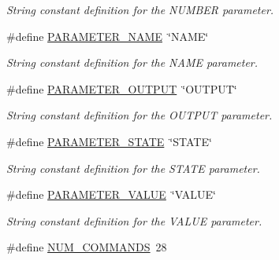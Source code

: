 \begin{DoxyCompactItemize}
\begin{DoxyCompactList}\small\item\em String constant definition for the N\-U\-M\-B\-E\-R parameter. \end{DoxyCompactList}\item 
\hypertarget{group__command__interpreter_gacd4917419f347a3210e7b468c47188f0}{\#define \hyperlink{group__command__interpreter_gacd4917419f347a3210e7b468c47188f0}{P\-A\-R\-A\-M\-E\-T\-E\-R\-\_\-\-N\-A\-M\-E}~\char`\"{}N\-A\-M\-E\char`\"{}}\label{group__command__interpreter_gacd4917419f347a3210e7b468c47188f0}

\begin{DoxyCompactList}\small\item\em String constant definition for the N\-A\-M\-E parameter. \end{DoxyCompactList}\item 
\hypertarget{group__command__interpreter_gae845277b8fe01a11cfad1732696507d3}{\#define \hyperlink{group__command__interpreter_gae845277b8fe01a11cfad1732696507d3}{P\-A\-R\-A\-M\-E\-T\-E\-R\-\_\-\-O\-U\-T\-P\-U\-T}~\char`\"{}O\-U\-T\-P\-U\-T\char`\"{}}\label{group__command__interpreter_gae845277b8fe01a11cfad1732696507d3}

\begin{DoxyCompactList}\small\item\em String constant definition for the O\-U\-T\-P\-U\-T parameter. \end{DoxyCompactList}\item 
\hypertarget{group__command__interpreter_gaa4e33f1b6e384ab8abcb41c12924896c}{\#define \hyperlink{group__command__interpreter_gaa4e33f1b6e384ab8abcb41c12924896c}{P\-A\-R\-A\-M\-E\-T\-E\-R\-\_\-\-S\-T\-A\-T\-E}~\char`\"{}S\-T\-A\-T\-E\char`\"{}}\label{group__command__interpreter_gaa4e33f1b6e384ab8abcb41c12924896c}

\begin{DoxyCompactList}\small\item\em String constant definition for the S\-T\-A\-T\-E parameter. \end{DoxyCompactList}\item 
\hypertarget{group__command__interpreter_ga5a03812b6ac732c91bbca5149d3e14bd}{\#define \hyperlink{group__command__interpreter_ga5a03812b6ac732c91bbca5149d3e14bd}{P\-A\-R\-A\-M\-E\-T\-E\-R\-\_\-\-V\-A\-L\-U\-E}~\char`\"{}V\-A\-L\-U\-E\char`\"{}}\label{group__command__interpreter_ga5a03812b6ac732c91bbca5149d3e14bd}

\begin{DoxyCompactList}\small\item\em String constant definition for the V\-A\-L\-U\-E parameter. \end{DoxyCompactList}\item 
\hypertarget{group__command__interpreter_gadef3034178d2e2de064a8709350e8f01}{\#define \hyperlink{group__command__interpreter_gadef3034178d2e2de064a8709350e8f01}{N\-U\-M\-\_\-\-C\-O\-M\-M\-A\-N\-D\-S}~28}\label{group__command__interpreter_gadef3034178d2e2de064a8709350e8f01}


\end{DoxyCompactItemize}
